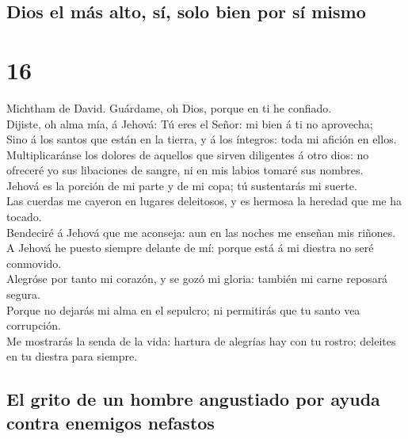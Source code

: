 \hypertarget{dios-el-muxe1s-alto-suxed-solo-bien-por-suxed-mismo}{%
\subsection{Dios el más alto, sí, solo bien por sí
mismo}\label{dios-el-muxe1s-alto-suxed-solo-bien-por-suxed-mismo}}

\hypertarget{section-15}{%
\section{16}\label{section-15}}

 Michtham de David. Guárdame, oh Dios, porque en ti he
confiado.\\
 Dijiste, oh alma mía, á Jehová: Tú eres el Señor: mi bien
á ti no aprovecha;\\
 Sino á los santos que están en la tierra, y á los
íntegros: toda mi afición en ellos.\\
 Multiplicaránse los dolores de aquellos que sirven
diligentes á otro dios: no ofreceré yo sus libaciones de sangre, ni en
mis labios tomaré sus nombres.\\
 Jehová es la porción de mi parte y de mi copa; tú
sustentarás mi suerte.\\
 Las cuerdas me cayeron en lugares deleitosos, y es
hermosa la heredad que me ha tocado.\\
 Bendeciré á Jehová que me aconseja: aun en las noches me
enseñan mis riñones.\\
 A Jehová he puesto siempre delante de mí: porque está á
mi diestra no seré conmovido.\\
 Alegróse por tanto mi corazón, y se gozó mi gloria:
también mi carne reposará segura.\\
 Porque no dejarás mi alma en el sepulcro; ni permitirás
que tu santo vea corrupción.\\
 Me mostrarás la senda de la vida: hartura de alegrías
hay con tu rostro; deleites en tu diestra para siempre.

\hypertarget{el-grito-de-un-hombre-angustiado-por-ayuda-contra-enemigos-nefastos}{%
\subsection{El grito de un hombre angustiado por ayuda contra enemigos
nefastos}\label{el-grito-de-un-hombre-angustiado-por-ayuda-contra-enemigos-nefastos}}

